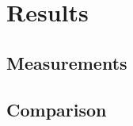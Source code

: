 \chapter{Results}
\label{ch:results}

\section{Measurements}
\lipsum[41-50]

\section{Comparison}
\lipsum[51-58]
